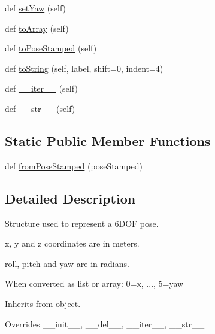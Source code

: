 \begin{DoxyCompactItemize}
\item 
def \mbox{\hyperlink{classwindshape_1_1drone_1_1common_1_1_drone_pose_1_1_drone_pose_a5eb8808fe149c4c2a0d635df43e837fd}{set\+Yaw}} (self)
\item 
def \mbox{\hyperlink{classwindshape_1_1drone_1_1common_1_1_drone_pose_1_1_drone_pose_a3536e8c8371167b7b1e224065403bfde}{to\+Array}} (self)
\item 
def \mbox{\hyperlink{classwindshape_1_1drone_1_1common_1_1_drone_pose_1_1_drone_pose_a4bc818606b6fd4b97bc845313bbb1e71}{to\+Pose\+Stamped}} (self)
\item 
def \mbox{\hyperlink{classwindshape_1_1drone_1_1common_1_1_drone_pose_1_1_drone_pose_a15505ebfbe68d80031b8f81a9a9a3bf4}{to\+String}} (self, label, shift=0, indent=4)
\item 
def \mbox{\hyperlink{classwindshape_1_1drone_1_1common_1_1_drone_pose_1_1_drone_pose_a90a37b7e1dbf0e0aec86ff14f2d84d1b}{\+\_\+\+\_\+iter\+\_\+\+\_\+}} (self)
\item 
def \mbox{\hyperlink{classwindshape_1_1drone_1_1common_1_1_drone_pose_1_1_drone_pose_ac18c8bd3269d606d6c3972b123ea8e64}{\+\_\+\+\_\+str\+\_\+\+\_\+}} (self)
\end{DoxyCompactItemize}
\subsection*{Static Public Member Functions}
\begin{DoxyCompactItemize}
\item 
def \mbox{\hyperlink{classwindshape_1_1drone_1_1common_1_1_drone_pose_1_1_drone_pose_a841a4ccd7030939d05025be65410ad86}{from\+Pose\+Stamped}} (pose\+Stamped)
\end{DoxyCompactItemize}


\subsection{Detailed Description}
\begin{DoxyVerb}Structure used to represent a 6DOF pose.

x, y and z coordinates are in meters.

roll, pitch and yaw are in radians.

When converted as list or array: 0=x, ..., 5=yaw

Inherits from object.
    
Overrides __init__, __del__, __iter__, __str__
\end{DoxyVerb}
 

